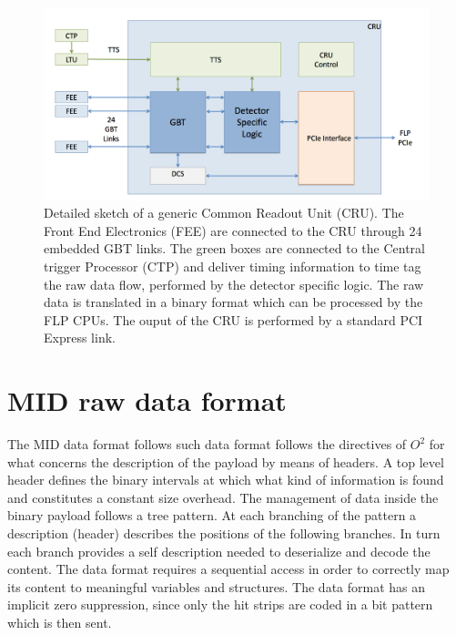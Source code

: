 \begin{figure}[!ht]
\begin{center}
\includegraphics[width=0.9\linewidth]{Chapters/O2/Figs/CRU.pdf}
\caption{Detailed sketch of a generic Common Readout Unit (CRU). The Front End Electronics (FEE) are connected to the CRU through 24 embedded GBT links. The green boxes are connected to the Central trigger Processor (CTP) and deliver timing information to time tag the raw data flow, performed by the detector specific logic. The raw data is translated in a binary format which can be processed by the FLP CPUs. The ouput of the CRU is performed by a standard PCI Express link.}
\label{fig:O2_CRU}
\end{center}
\end{figure}

\section{MID raw data format}
The MID data format follows such data format follows the directives of $O^2$ for what concerns the description of the payload by means of headers.
A top level header defines the binary intervals at which what kind of information is found and constitutes a constant size overhead.
The management of data inside the binary payload follows a tree pattern.
At each branching of the pattern a description (header) describes the positions of the following branches.
In turn each branch provides a self description needed to deserialize and decode the content.
The data format requires a sequential access in order to correctly map its content to meaningful variables and structures.
The data format has an implicit zero suppression, since only the hit strips are coded in a bit pattern which is then sent.


